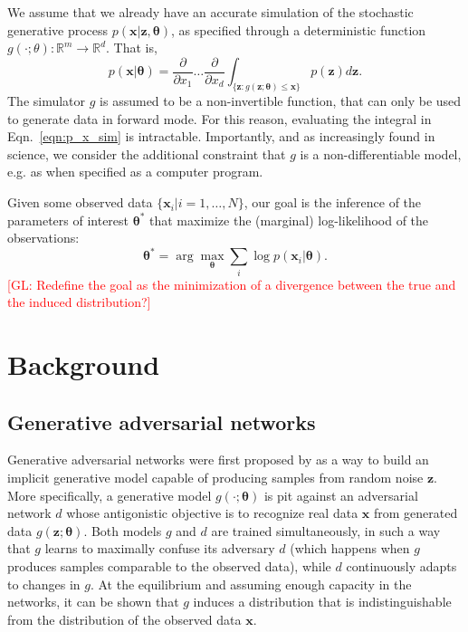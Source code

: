 \documentclass[twocolumn,superscriptaddress,aps]{revtex4-1}
\newcommand{\glnote}[1]{\textcolor{red}{[GL: #1]}}
\theoremstyle{plain}
\begin{document}
We assume that we already have an accurate simulation of the stochastic generative process
$p(\mathbf{x}|\mathbf{z},\mathbf{\theta})$, as specified through a deterministic function $g(\cdot;
\theta) : \mathbb{R}^m \to \mathbb{R}^d$. That is,
\begin{equation}\label{eqn:p_x_sim}
    p(\mathbf{x}|\mathbf{\theta}) = \frac{\partial}{\partial x_1} \dots \frac{\partial}{\partial x_d} \int_{\{\mathbf{z}:g(\mathbf{z};\mathbf{\theta}) \leq \mathbf{x}\}} p(\mathbf{z}) d\mathbf{z}.
\end{equation}
The simulator $g$ is assumed to be a non-invertible function, that can
only be used to generate data in forward mode.
For this reason, evaluating the integral in Eqn.~\ref{eqn:p_x_sim} is intractable.
Importantly, and as increasingly found in science, we consider the additional constraint that $g$ is a non-differentiable
model, e.g. as when specified as a computer program.

Given some observed data $\{ \mathbf{x}_i | i=1, \dots, N \}$, our goal is the inference
of the parameters of interest $\mathbf{\theta}^*$ that maximize the (marginal) log-likelihood of the observations:
\begin{equation}
    \mathbf{\theta}^* = \arg \max_\mathbf{\theta} \sum_i \log p(\mathbf{x}_i | \mathbf{\theta}).
\end{equation}
\glnote{Redefine the goal as the minimization of a divergence between the true and the induced distribution?}



\section{Background}

\subsection{Generative adversarial networks}

Generative adversarial networks were first proposed by
\cite{goodfellow2014generative} as a way to build an implicit generative model
capable of producing samples from random noise $\mathbf{z}$. More specifically,
a generative model $g(\cdot; \mathbf{\theta})$ is pit against an adversarial
network $d$ whose antigonistic objective is to recognize real data $\mathbf{x}$
from generated data $g(\mathbf{z}; \mathbf{\theta})$. Both models $g$ and $d$
are trained simultaneously, in such a way that $g$ learns to maximally confuse
its adversary $d$ (which happens when $g$ produces samples comparable to the
observed data), while $d$ continuously adapts to changes in $g$. At the
equilibrium and assuming enough capacity in the networks, it can be shown that
$g$ induces a distribution  that is indistinguishable from the distribution of
the observed data $\mathbf{x}$.
\end{document}
